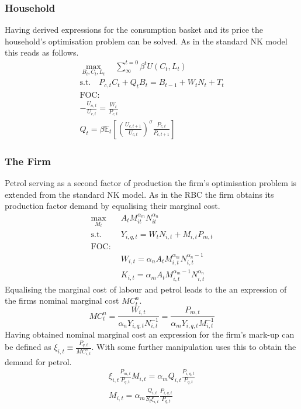 \documentclass[12pt,a4paper,english]{article} %
\newcommand{\E}{\mathbb{E}} %
\begin{document}
	\subsubsection{Household}
	Having derived expressions for the consumption basket and its price the household's optimisation problem can be solved. As in the standard NK model this reads as follows. 
	\begin{equation}
		\begin{aligned}
			\max_{B_t, C_t, L_t} \quad \sum_{\infty}^{t=0} \beta^{t} U(C_{t}, L_{t}) \\
			\textrm{s.t.} \quad P_{c,t} C_t + Q_t B_t = B_{t-1} + W_t N_t + T_t \\
			\textrm{FOC:} \\
			- \frac{U_{n,t}}{U_{c, t}} = \frac{W_t}{P_{c,t}}\\
			Q_t = \beta \E_t \left[ \left( \frac{U_{c, t+1}}{U_{c,t}} \right)^\sigma \frac{P_{c,t}}{P_{c,t+1}} \right] 			
		\end{aligned}
	\end{equation}

	\subsubsection{The Firm}
	Petrol serving as a second factor of production the firm's optimisation problem is extended from the standard NK model. As in the RBC the firm obtains its production factor demand by equalising their marginal cost. 
	\begin{equation}
		\begin{aligned}
			\max_{M_t} \quad & A_t M_{it}^{\alpha_m} N_{it}^{\alpha_n} \\
			\textrm{s.t.} \quad & Y_{i,q,t} = W_t N_{i,t} + M_{i,t} P_{m,t}\\
			\textrm{FOC:} \\
			\quad & W_{i,t} = \alpha_n A_t M_{i,t}^{\alpha_m} N_{i,t}^{\alpha_n -1}\\
			\quad & K_{i,t} = \alpha_m A_t M_{i,t}^{\alpha_m -1} N_{i,t}^{\alpha_n}
		\end{aligned}
	\end{equation}
	Equalising the marginal cost of labour and petrol leads to the an expression of the firms nominal marginal cost $MC_{t}^n$.
	\begin{equation}
		MC_t^n = \frac{W_{i,t}}{\alpha_n Y_{i,q,t} N_{i,t}^{-1}} = \frac{P_{m,t}}{\alpha_m Y_{i,q,t} M_{i,t}^{-1}}
	\end{equation}
	Having obtained nominal marginal cost an expression for the firm's mark-up can be defined as $\xi_{i,t} \equiv \frac{P_{q,t}}{MC_{i,t}^n}$. With some further manipulation \cite{blanchard_macroeconomic_2007} uses this to obtain the demand for petrol.
	\begin{equation}
		\begin{aligned}
		\xi_{i,t} \frac{P_{m,t}}{P_{q,t}} M_{i,t} = \alpha_m Q_{i,t} \frac{P_{i,q,t}}{P_{q,t}} \\
		M_{i,t} = \alpha_m \frac{Q_{i,t}}{S_t \xi_{i,t}} \frac{P_{i,q,t}}{P_{q,t}}
	\end{aligned}
	\end{equation}
\end{document}
